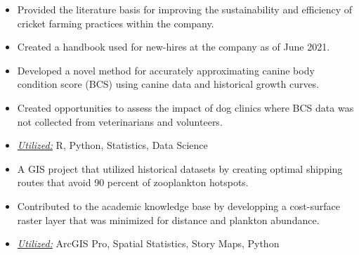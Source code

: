 \documentclass[10pt,a4paper,ragged2e]{altacv}
\begin{document}
\begin{itemize}
\item Provided the literature basis for improving the sustainability and efficiency of cricket farming practices within the company.
\item Created a handbook used for new-hires at the company as of June 2021.
\end{itemize} 
\divider\small


\begin{itemize}
  \item Developed a novel method for accurately approximating canine body condition score (BCS) using canine data and historical growth curves.
  \item Created opportunities to assess the impact of dog clinics where BCS data was not collected from veterinarians and volunteers.
  \item \underline{\textit{Utilized:}} R, Python, Statistics, Data Science
\end{itemize}
\divider\small

\begin{itemize}
  \item A GIS project that utilized historical datasets by creating optimal shipping routes that avoid 90 percent of zooplankton hotspots.
  \item Contributed to the academic knowledge base by developping a cost-surface raster layer that was minimized for distance and plankton abundance.
  \item \underline{\textit{Utilized:}} ArcGIS Pro, Spatial Statistics, Story Maps, Python
\end{itemize}
\divider\small
\end{document}
